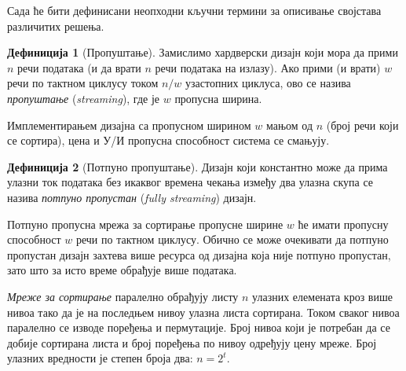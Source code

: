 \documentclass[12pt, a4paper]{article}
\theoremstyle{definition}
\newtheorem{definition}{Дефиниција}[section]
\begin{document}
Сада ће бити дефинисани неопходни кључни термини за описивање својстава различитих решења.
\begin{definition}[Пропуштање]
Замислимо хардверски дизајн који мора да прими $n$ речи података (и да врати $n$ речи података на излазу). Ако прими (и врати) $w$ речи по тактном циклусу током $n/w$ узастопних циклуса, ово се назива \textit{пропуштање} (\textit{streaming}), где је $w$ пропусна ширина.
\end{definition}
Имплементирањем дизајна са пропусном ширином $w$ мањом од $n$ (број речи који се сортира), цена и У/И пропусна способност система се смањују.
\begin{definition}[Потпуно пропуштање]
Дизајн који константно може да прима улазни ток података без икаквог времена чекања између два улазна скупа се назива \textit{потпуно пропустан} (\textit{fully streaming}) дизајн.
\end{definition}
Потпуно пропусна мрежа за сортирање пропусне ширине $w$ ће имати пропусну способност $w$ речи по тактном циклусу. Обично се може очекивати да потпуно пропустан дизајн захтева више ресурса од дизајна која није потпуно пропустан, зато што за исто време обрађује више података.

\textit{Мреже за сортирање} паралелно обрађују листу $n$ улазних елемената кроз више нивоа тако да је на последњем нивоу улазна листа сортирана. Током сваког нивоа паралелно се изводе поређења и пермутације. Број нивоа који је потребан да се добије сортирана листа и број поређења по нивоу одређују цену мреже. Број улазних вредности је степен броја два: $n = 2^t$.
\end{document}
